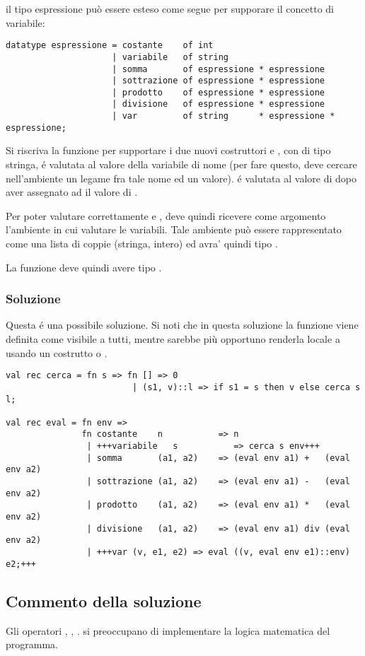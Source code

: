 il tipo espressione può essere esteso come segue per supporare il concetto di variabile:
\begin{lstlisting}[style = SML, caption = {Definizione del tipo di dato \sml{espressione}}]
datatype espressione = costante    of int
					 | variabile   of string
					 | somma       of espressione * espressione
					 | sottrazione of espressione * espressione
					 | prodotto    of espressione * espressione
					 | divisione   of espressione * espressione
					 | var         of string      * espressione * espressione;
\end{lstlisting}

Si riscriva la funzione  per supportare i due nuovi costruttori  e , con  di tipo stringa, é valutata al valore della variabile di nome  (per fare questo,  deve cercare nell'ambiente un legame fra tale nome ed un valore). %
 é valutata al valore di  dopo aver assegnato ad  il valore di .

\medskip
Per poter valutare correttamente  e ,  deve quindi ricevere come argomento l'ambiente in cui valutare le variabili. %
Tale ambiente può essere rappresentato come una lista di coppie (stringa, intero) ed avra' quindi tipo .

\medskip
La funzione  deve quindi avere tipo .

\subsubsection{Soluzione}

Questa é una possibile soluzione. %
Si noti che in questa soluzione la funzione  viene definita come visibile a tutti, mentre sarebbe più opportuno renderla locale a  usando un costrutto  o .
\begin{lstlisting}[style = SML, caption = {Definizione della funzione \sml{eval}}]
val rec cerca = fn s => fn [] => 0
						 | (s1, v)::l => if s1 = s then v else cerca s l;

val rec eval = fn env =>
			   fn costante    n           => n
			   	| +++variabile   s           => cerca s env+++
				| somma       (a1, a2)    => (eval env a1) +   (eval env a2)
				| sottrazione (a1, a2)    => (eval env a1) -   (eval env a2)
				| prodotto    (a1, a2)    => (eval env a1) *   (eval env a2)
				| divisione   (a1, a2)    => (eval env a1) div (eval env a2)
				| +++var (v, e1, e2) => eval ((v, eval env e1)::env) e2;+++
\end{lstlisting}

\subsection{Commento della soluzione}

Gli operatori \sml{+}, \sml{-}, \sml{*}.  si preoccupano di implementare la logica matematica del programma.
